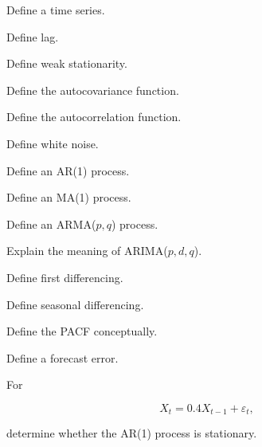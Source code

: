 \begin{exercise}[1]
Define a time series.
\end{exercise}

\begin{exercise}[1]
Define lag.
\end{exercise}

\begin{exercise}[1]
Define weak stationarity.
\end{exercise}

\begin{exercise}[1]
Define the autocovariance function.
\end{exercise}

\begin{exercise}[1]
Define the autocorrelation function.
\end{exercise}

\begin{exercise}[1]
Define white noise.
\end{exercise}

\begin{exercise}[1]
Define an AR(1) process.
\end{exercise}

\begin{exercise}[1]
Define an MA(1) process.
\end{exercise}

\begin{exercise}[1]
Define an ARMA(\(p,q\)) process.
\end{exercise}

\begin{exercise}[1]
Explain the meaning of ARIMA(\(p,d,q\)).
\end{exercise}

\begin{exercise}[1]
Define first differencing.
\end{exercise}

\begin{exercise}[1]
Define seasonal differencing.
\end{exercise}

\begin{exercise}[1]
Define the PACF conceptually.
\end{exercise}

\begin{exercise}[1]
Define a forecast error.
\end{exercise}

\begin{exercise}[2]
For

\[
X_t
=
0.4X_{t-1}
+
\varepsilon_t,
\]

determine whether the AR(1) process is stationary.
\end{exercise}

